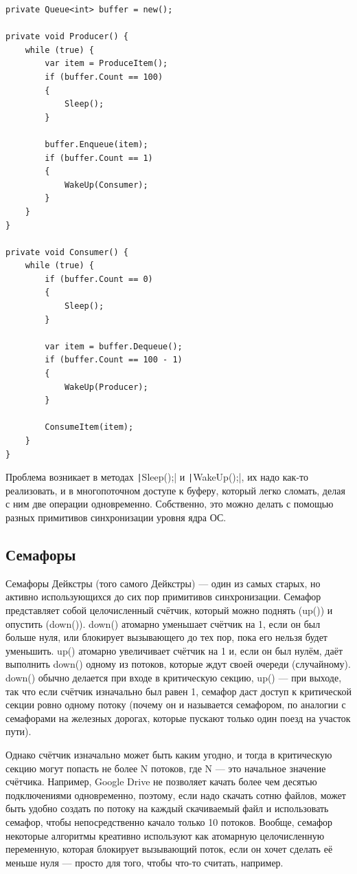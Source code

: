\documentclass{../../text-style}
\begin{document}
\begin{verbatim}
private Queue<int> buffer = new();

private void Producer() {
    while (true) {
        var item = ProduceItem();
        if (buffer.Count == 100)
        {
            Sleep();
        }

        buffer.Enqueue(item);
        if (buffer.Count == 1)
        {
            WakeUp(Consumer);
        }
    }
}

private void Consumer() {
    while (true) {
        if (buffer.Count == 0)
        {
            Sleep();
        }

        var item = buffer.Dequeue();
        if (buffer.Count == 100 - 1)
        {
            WakeUp(Producer);
        }

        ConsumeItem(item);
    }
}
\end{verbatim}

Проблема возникает в методах \texttt|Sleep();| и \texttt|WakeUp();|, их надо как-то реализовать, и в многопоточном доступе к буферу, который легко сломать, делая с ним две операции одновременно. Собственно, это можно делать с помощью разных примитивов синхронизации уровня ядра ОС.

\subsection{Семафоры}

Семафоры Дейкстры (того самого Дейкстры) --- один из самых старых, но активно использующихся до сих пор примитивов синхронизации. Семафор представляет собой целочисленный счётчик, который можно поднять (up()) и опустить (down()). down() атомарно уменьшает счётчик на 1, если он был больше нуля, или блокирует вызывающего до тех пор, пока его нельзя будет уменьшить. up() атомарно увеличивает счётчик на 1 и, если он был нулём, даёт выполнить down() одному из потоков, которые ждут своей очереди (случайному). down() обычно делается при входе в критическую секцию, up() --- при выходе, так что если счётчик изначально был равен 1, семафор даст доступ к критической секции ровно одному потоку (почему он и называется семафором, по аналогии с семафорами на железных дорогах, которые пускают только один поезд на участок пути). 

Однако счётчик изначально может быть каким угодно, и тогда в критическую секцию могут попасть не более N потоков, где N --- это начальное значение счётчика. Например, Google Drive не позволяет качать более чем десятью подключениями одновременно, поэтому, если надо скачать сотню файлов, может быть удобно создать по потоку на каждый скачиваемый файл и использовать семафор, чтобы непосредственно качало только 10 потоков. Вообще, семафор некоторые алгоритмы креативно используют как атомарную целочисленную переменную, которая блокирует вызывающий поток, если он хочет сделать её меньше нуля --- просто для того, чтобы что-то считать, например.
\end{document}
